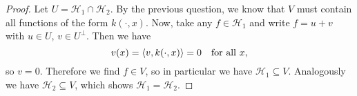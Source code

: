 \documentclass{article}
\theoremstyle{plain}
\theoremstyle{remark}
\newcommand{\Cal}{\mathcal}
\newcommand\XX{\Cal X}
\newcommand\HH{\Cal H}
\DeclarePairedDelimiter{\ang}{\langle}{\rangle}
\renewcommand\P{^\perp}
\DeclareMathOperator{\Span}{Span}
\begin{document}
\begin{proof}
%	
%	
Let $U = \HH_1 \cap \HH_2$. By the previous question, we know that $V$ must contain all functions of the form $k(\cdot, x)$. Now, take any $f \in \HH_1$ and write $f = u + v$ with $u \in U$, $v \in U\P$. Then we have
\[
v(x) = \ang{v, k(\cdot, x)} = 0 \quad\text{for all $x$}, 
\]
so $v = 0$. Therefore we find $f \in V$, so in particular we have $\HH_1 \subseteq V$. Analogously we have $\HH_2 \subseteq V$, which shows $\HH_1 = \HH_2$.
\end{proof}
\end{document}
